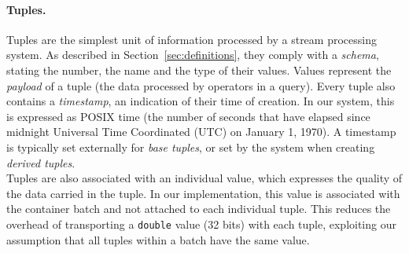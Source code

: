 \paragraph*{Tuples.}
\label{sec:tuples}
Tuples are the simplest unit of information processed by a stream processing system.
As described in Section~\ref{sec:definitions}, they comply with a \textit{schema}, stating the number,
the name and the type of their values.
Values represent the \emph{payload} of a tuple (\ie the data processed by operators in a query).
Every tuple also contains a \emph{timestamp}, an indication of their time of creation.
In our system, this is expressed as POSIX time (\ie the number of seconds that have elapsed since
midnight Universal Time Coordinated (UTC) on January 1, 1970).
A timestamp is typically set externally for \emph{base tuples}, or set by the system when creating
\emph{derived tuples}.\\
Tuples are also associated with an individual \sic value, which expresses the quality of the data carried
in the tuple.
In our implementation, this value is associated with the container batch and not attached to each
individual tuple.
This reduces the overhead of transporting a \texttt{double} value (32 bits) with each tuple, exploiting
our assumption that all tuples within a batch have the same \sic value.

